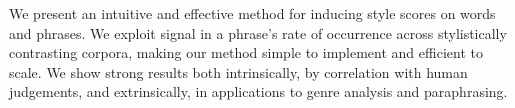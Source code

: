 We present an intuitive and effective method for inducing style scores on words and phrases. We exploit signal in a phrase's rate of occurrence across stylistically contrasting corpora, making our method simple to implement and efficient to scale. We show strong results both intrinsically, by correlation with human judgements, and extrinsically, in applications to genre analysis and paraphrasing.
